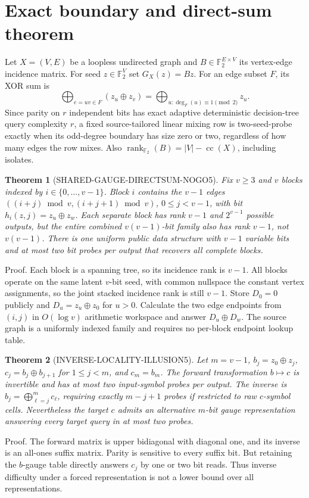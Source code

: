 \documentclass[11pt]{article}
\newtheorem{theorem}{Theorem}
\begin{document}
\section{Exact boundary and direct-sum theorem}
Let \(X=(V,E)\) be a loopless undirected graph and \(B\in\mathbb F_2^{E\times V}\) its vertex-edge incidence matrix. For seed \(z\in\mathbb F_2^V\) set \(G_X(z)=Bz\). For an edge subset \(F\), its XOR sum is
\[
  \bigoplus_{e=uv\in F}(z_u\oplus z_v)
  =\bigoplus_{u:\deg_F(u)\equiv1\pmod2}z_u.
\]
Since parity on \(r\) independent bits has exact adaptive deterministic decision-tree query complexity \(r\), a fixed source-tailored linear mixing row is two-seed-probe exactly when its odd-degree boundary has size zero or two, regardless of how many edges the row mixes. Also \(\operatorname{rank}_{\mathbb F_2}(B)=|V|-\operatorname{cc}(X)\), including isolates.

\begin{theorem}[SHARED-GAUGE-DIRECTSUM-NOGO5]
Fix \(v\ge3\) and \(v\) blocks indexed by \(i\in\{0,\ldots,v-1\}\). Block \(i\) contains the \(v-1\) edges \(((i+j)\bmod v,(i+j+1)\bmod v)\), \(0\le j<v-1\), with bit \(h_i(z,j)=z_u\oplus z_w\). Each separate block has rank \(v-1\) and \(2^{v-1}\) possible outputs, but the entire combined \(v(v-1)\)-bit family also has rank \(v-1\), not \(v(v-1)\). There is one uniform public data structure with \(v-1\) variable bits and at most two bit probes per output that recovers all complete blocks.
\end{theorem}
\noindent Proof. Each block is a spanning tree, so its incidence rank is \(v-1\). All blocks operate on the same latent \(v\)-bit seed, with common nullspace the constant vertex assignments, so the joint stacked incidence rank is still \(v-1\). Store \(D_0=0\) publicly and \(D_u=z_u\oplus z_0\) for \(u>0\). Calculate the two edge endpoints from \((i,j)\) in \(O(\log v)\) arithmetic workspace and answer \(D_u\oplus D_w\). The source graph is a uniformly indexed family and requires no per-block endpoint lookup table.

\begin{theorem}[INVERSE-LOCALITY-ILLUSION5]
Let \(m=v-1\), \(b_j=z_0\oplus z_j\), \(c_j=b_j\oplus b_{j+1}\) for \(1\le j<m\), and \(c_m=b_m\). The forward transformation \(b\mapsto c\) is invertible and has at most two input-symbol probes per output. The inverse is \(b_j=\bigoplus_{\ell=j}^m c_\ell\), requiring exactly \(m-j+1\) probes if restricted to raw \(c\)-symbol cells. Nevertheless the target \(c\) admits an alternative \(m\)-bit gauge representation answering every target query in at most two probes.
\end{theorem}
\noindent Proof. The forward matrix is upper bidiagonal with diagonal one, and its inverse is an all-ones suffix matrix. Parity is sensitive to every suffix bit. But retaining the \(b\)-gauge table directly answers \(c_j\) by one or two bit reads. Thus inverse difficulty under a forced representation is not a lower bound over all representations.
\end{document}
